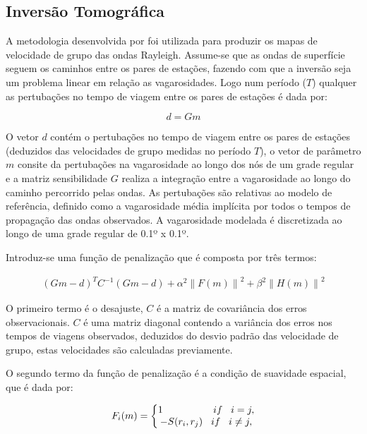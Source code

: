 \subsection{Inversão Tomográfica}

A metodologia desenvolvida por  \cite{barmin_fast_2001} foi utilizada para produzir os mapas de velocidade de grupo das ondas Rayleigh. Assume-se que as ondas de superfície seguem os caminhos entre os pares de estações, fazendo com que a inversão seja um problema linear em relação as vagarosidades. Logo num período ($T$) qualquer as pertubações no tempo de viagem entre os pares de estações é dada por:

\begin{equation}
d=Gm
\end{equation} 

O vetor $d$ contém o pertubações no tempo de viagem entre os pares de estações (deduzidos das velocidades de grupo medidas no período $T$), o vetor de parâmetro $m$ consite da pertubações na vagarosidade ao longo dos nós de um grade regular e a matriz sensibilidade $G$ realiza a integração entre a vagarosidade ao longo do caminho percorrido pelas ondas. As pertubações são relativas ao modelo de referência, definido como a vagarosidade média implícita por todos o tempos de propagação das ondas observados. A vagarosidade modelada é discretizada ao longo de uma grade regular de 0.1º x 0.1º. 

Introduz-se uma função de penalização que é composta por três termos:

\begin{eqnarray}
(Gm-d)^{T}C^{-1}(Gm-d) + \alpha ^{2} \left \| F(m)  \right \| ^{2} + \beta ^{2 } \left \| H(m)  \right \| ^{2}
\end{eqnarray}

O primeiro termo é o desajuste, $C$ é a matriz de covariância dos erros observacionais. $C$ é uma matriz diagonal contendo a variância dos erros nos tempos de viagens observados, deduzidos do desvio padrão das velocidade de grupo, estas velocidades são calculadas previamente. 

O segundo termo da função de penalização é a condição de suavidade espacial, que é dada por:

\begin{eqnarray}
F_{i}(m)=
 \left\{\begin{matrix}
1 \hspace{18mm} if \hspace{3mm} i = j,
\\ 
-S(r_{i},r_{j}) \hspace{3mm} if \hspace{3mm} i \neq j,
\end{matrix}\right.
\end{eqnarray}

